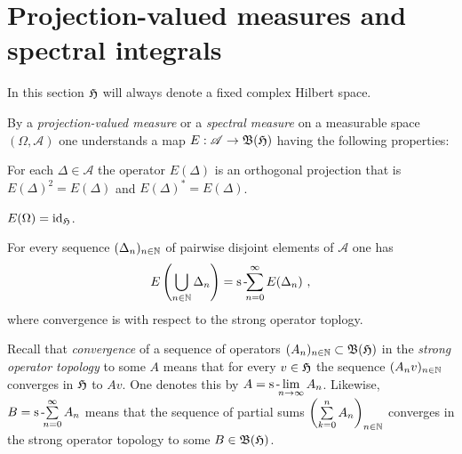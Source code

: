 %
\section{Projection-valued measures and spectral integrals}
\para
  In this section $\mathfrak{H}$ will always denote a fixed complex Hilbert space. 
\begin{definition}
  By a \emph{projection-valued measure} or a \emph{spectral measure} on a 
  measurable space $(\Omega,\mathscr{A})$ one understands a map 
  $E: \mathscr{A} \to \mathfrak{B}(\mathfrak{H})$ having the following properties:
  \begin{axiomlist}[SM]
  \setcounter{enumi}{-1}
  \item For each $\Delta \in \mathscr{A}$ the operator $E(\Delta)$ is an orthogonal projection 
        that is $E(\Delta)^2 = E(\Delta)$ and $E(\Delta)^* = E(\Delta)$.
  \item $E(\Omega) = \mathrm{id}_{\mathfrak{H}}$.
  \item For every sequence $(\Delta_n)_{n\in \mathbb{N}}$ of pairwise disjoint elements of $\mathscr{A}$ 
        one has 
        \[ E\left(\bigcup_{n\in\mathbb{N}} \Delta_n \right) =   \textup{s\,-\!\!}\sum_{n=0}^\infty E(\Delta_n) \ , \] 
        where convergence is with respect to the strong operator toplogy.
  \end{axiomlist}
\end{definition}

\begin{remark}
  Recall that \emph{convergence}  of a sequence of operators 
  $(A_n)_{n\in \mathbb{N}} \subset \mathfrak{B}(\mathfrak{H})$ in the \emph{strong operator topology} to some $A $ means 
  that for every $v\in \mathfrak{H}$ the sequence $(A_nv)_{n\in\mathbb{N}}$ converges in $\mathfrak{H}$ to $Av$. 
  One denotes this by $A =\textup{s\,-\!\!}\lim\limits_{n\to\infty} A_n$. 
  Likewise, $B = \textup{s\,-\!\!}\sum\limits_{n=0}^\infty A_n$ means that the sequence of partial sums 
  $\left( \sum\limits_{k=0}^n A_n \right)_{n\in \mathbb{N}}$ converges  in the strong operator topology 
  to some $B  \in \mathfrak{B} (\mathfrak{H})$.
\end{remark}

